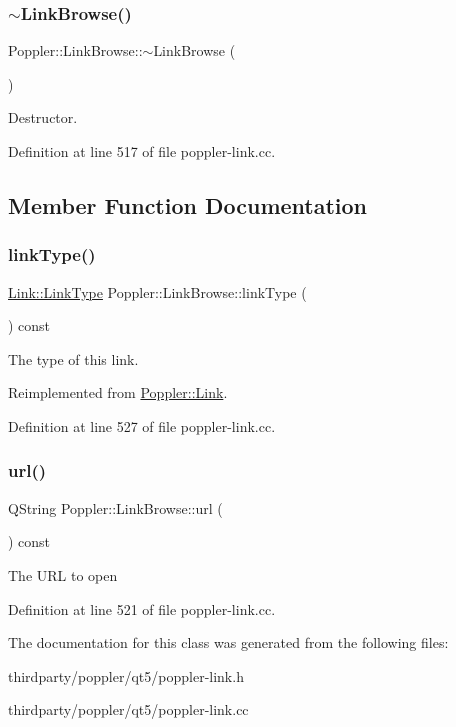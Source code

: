 \subsubsection{\texorpdfstring{$\sim$\+Link\+Browse()}{~LinkBrowse()}}
{\footnotesize\ttfamily Poppler\+::\+Link\+Browse\+::$\sim$\+Link\+Browse (\begin{DoxyParamCaption}{ }\end{DoxyParamCaption})}

Destructor. 

Definition at line 517 of file poppler-\/link.\+cc.



\subsection{Member Function Documentation}
\mbox{\label{class_poppler_1_1_link_browse_a9743123e724e1a4076083cff8b290a31}} 
\subsubsection{\texorpdfstring{link\+Type()}{linkType()}}
{\footnotesize\ttfamily \hyperlink{class_poppler_1_1_link_af0dacfa77a548bb043dbae4bb9dc6c1e}{Link\+::\+Link\+Type} Poppler\+::\+Link\+Browse\+::link\+Type (\begin{DoxyParamCaption}{ }\end{DoxyParamCaption}) const\hspace{0.3cm}{\ttfamily [virtual]}}

The type of this link. 

Reimplemented from \hyperlink{class_poppler_1_1_link_a3e3ad7e8867e255c24b9a562bad596ed}{Poppler\+::\+Link}.



Definition at line 527 of file poppler-\/link.\+cc.

\mbox{\label{class_poppler_1_1_link_browse_acc3885a70d0f74a34260da47a25fe6dc}} 
\subsubsection{\texorpdfstring{url()}{url()}}
{\footnotesize\ttfamily Q\+String Poppler\+::\+Link\+Browse\+::url (\begin{DoxyParamCaption}{ }\end{DoxyParamCaption}) const}

The U\+RL to open 

Definition at line 521 of file poppler-\/link.\+cc.



The documentation for this class was generated from the following files\+:\begin{DoxyCompactItemize}
\item 
thirdparty/poppler/qt5/poppler-\/link.\+h\item 
thirdparty/poppler/qt5/poppler-\/link.\+cc\end{DoxyCompactItemize}
